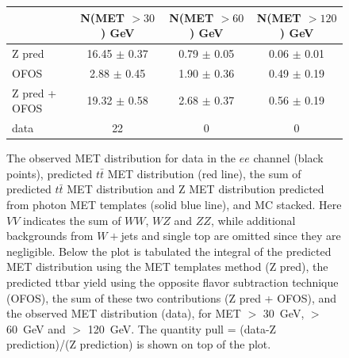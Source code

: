 \begin{figure}[hbtp]
  \begin{center}

	\medskip 

    \begin{tabular}{lccc}
\hline
                        &   N(MET $>30$)  GeV    &   N(MET $>60$)  GeV    &   N(MET $>120$) GeV   \\
\hline
              Z pred    &  16.45  $\pm$  0.37    &   0.79  $\pm$  0.05    &   0.06  $\pm$  0.01   \\
                OFOS    &   2.88  $\pm$  0.45    &   1.90  $\pm$  0.36    &   0.49  $\pm$  0.19   \\
\hline
       Z pred + OFOS    &  19.32  $\pm$  0.58    &   2.68  $\pm$  0.37    &   0.56  $\pm$  0.19   \\
\hline
                data    &                  22    &                   0    &                   0   \\
\hline
    \end{tabular}

    \caption{
      The observed MET distribution for data in the $ee$ channel (black points),
      predicted $t\bar{t}$ MET distribution (red line), the sum of predicted $t\bar{t}$ MET distribution and
      Z  MET  distribution  predicted  from photon  MET  templates
      (solid blue line),  and MC stacked. Here $VV$  indicates the sum
      of  $WW$,  $WZ$  and  $ZZ$, while  additional  backgrounds  from
      $W+$jets   and   single  top   are   omitted   since  they   are
      negligible.  Below the  plot is  tabulated the  integral  of the
      predicted  MET distribution  using the  MET templates  method (Z
      pred),  the  predicted ttbar  yield  using  the opposite  flavor
      subtraction  technique (OFOS), the  sum of  these two
      contributions (Z pred + OFOS), and the observed MET distribution
      (data), for  MET $>$ 30~GeV,  $>$ 60~GeV and $>$  120~GeV. The
      quantity pull  = (data-Z prediction)/(Z prediction)  is shown on
      top  of the  plot.  
    }
    \label{fig:pfmet_ee}
  \end{center}
\end{figure}

